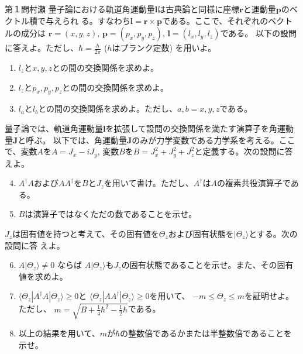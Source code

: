 \def\kB{k_{\mathrm{B}}}
\begin{question}{第１問}{村瀬}
量子論における軌道角運動量$\bm{l}$は古典論と同様に座標$\bm{r}$と運動量$\bm{p}$のベクトル積で与えられ
る。すなわち$\bm l=\bm r \times \bm p$である。ここで、それぞれのベクトルの成分は
$\bm r=(x,y,z),\,\bm p=(p_x,p_y,p_z),\,\bm l=(l_x,l_y,l_z)$である。
以下の設問に答えよ。ただし、$\hbar = \frac{h}{2\pi}$ ($h$はプランク定数)
を用いよ。
\begin{enumerate}
\item $l_z$と$x,y,z$との間の交換関係を求めよ。
\item $l_z$と$p_x,p_y,p_z$との間の交換関係を求めよ。
\item{}
  $l_a$と$l_b$との間の交換関係を求めよ。ただし、$a,b=x,y,z$である。
\end{enumerate}

量子論では、軌道角運動量$\bm l$を拡張して設問の交換関係を満たす演算子を角運動量$\bm J$と呼ぶ。
以下では、角運動量$\bm J$のみが力学変数である力学系を考える。ここで、変数$A$を$A=J_x-iJ_y$, 
変数$B$を$B=J_x^2+J_y^2+J_z^2$と定義する。次の設問に答えよ。
\begin{enumerate}
\setcounter{enumi}{3}
\item $A^\dag A$および$AA^\dag$を$B$と$J_z$を用いて書け。ただし、$A^\dag$は$A$の複素共役演算子である。
\item $B$は演算子ではなくただの数であることを示せ。
\end{enumerate}
$J_z$は固有値を持つと考えて、その固有値を$\Theta_z$および固有状態を$|\Theta_z\rangle$とする。次の設問に答
えよ。
\begin{enumerate}
\setcounter{enumi}{5}
\item $A|\Theta_z\rangle\neq 0$ ならば $A|\Theta_z\rangle$も$J_z$の固有状態であることを示せ。また、その固有値を求めよ。
\item $\langle\Theta_z|A^\dag A|\Theta_z\rangle\ge0$と
  $\langle\Theta_z|A A^\dag|\Theta_z\rangle\ge0$を用いて、
  $-m\le\Theta_z\le m$を証明せよ。ただし、
  $m=\sqrt{B+\frac14\hbar^2-\frac12\hbar}$である。
\item 以上の結果を用いて、$m$が$\hbar$の整数倍であるかまたは半整数倍であることを示せ。
\end{enumerate}
\end{question}

